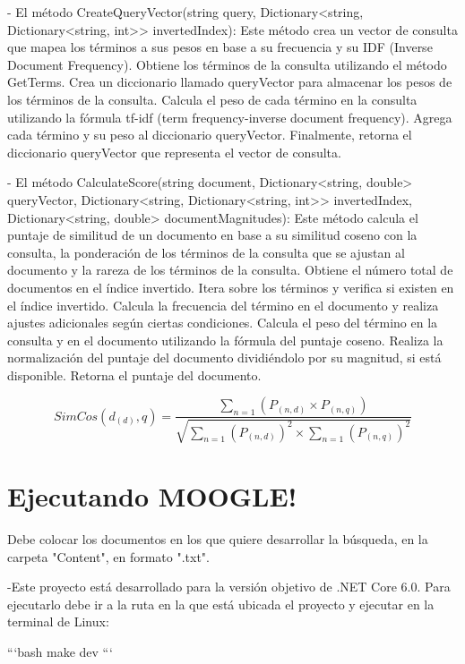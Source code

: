 \documentclass[aspectratio = 169, 14pt]{article}
\begin{document}
\begin{Large}
- El método CreateQueryVector(string query, Dictionary<string, 
Dictionary<string, int>> invertedIndex):
Este método crea un vector de consulta que mapea los términos
a sus pesos en base a su frecuencia y su IDF (Inverse Document Frequency).
Obtiene los términos de la consulta utilizando el método GetTerms.
Crea un diccionario llamado queryVector para almacenar 
los pesos de los términos de la consulta.
Calcula el peso de cada término en la consulta utilizando 
la fórmula tf-idf (term frequency-inverse document frequency).
Agrega cada término y su peso al diccionario queryVector.
Finalmente, retorna el diccionario queryVector que representa el vector de consulta.

- El método CalculateScore(string document, Dictionary<string, double> 
queryVector, Dictionary<string, Dictionary<string, int>> invertedIndex, 
Dictionary<string, double> documentMagnitudes):
Este método calcula el puntaje de similitud de un documento en 
base a su similitud coseno con la consulta, la ponderación de 
los términos de la consulta que se ajustan al documento y la 
rareza de los términos de la consulta.
Obtiene el número total de documentos en el índice invertido.
Itera sobre los términos y verifica si existen en el índice invertido.
Calcula la frecuencia del término en el documento y realiza 
ajustes adicionales según ciertas condiciones.
Calcula el peso del término en la consulta y en el documento 
utilizando la fórmula del puntaje coseno.
Realiza la normalización del puntaje del documento dividiéndolo 
por su magnitud, si está disponible.
Retorna el puntaje del documento.


\begin{displaymath}
SimCos(d_{(d)},q)=\frac{\displaystyle\sum_{n=1}(P_{(n,d)}\times P_{(n,q)})}{\sqrt{\displaystyle\sum_{n=1}(P_{(n,d)})^2 \times \displaystyle\sum_{n=1}(P_{(n,q)})^2}}
\end{displaymath}



\section{Ejecutando MOOGLE!}
Debe colocar los documentos en los que quiere desarrollar la búsqueda, en la carpeta
"Content", en formato ".txt".  

-Este proyecto está desarrollado para la versión objetivo de .NET Core 6.0. Para ejecutarlo debe ir a la ruta en la que está ubicada el proyecto y ejecutar en la terminal de Linux:

\begin{flushleft}
```bash\newline
make dev
```


\end{flushleft}
\end{Large}
\end{document}
